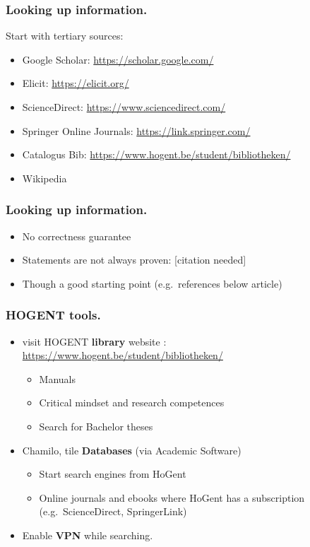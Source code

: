 \documentclass[aspectratio=169]{beamer}
\begin{document}
\begin{frame}
    \frametitle{Looking up information.}

    Start with \alert{tertiary} sources:

    \begin{itemize}
        \item Google Scholar: \url{https://scholar.google.com/}
        \item Elicit: \url{https://elicit.org/}
        \item ScienceDirect: \url{https://www.sciencedirect.com/}
        \item Springer Online Journals: \url{https://link.springer.com/}
        \item Catalogus Bib: \url{https://www.hogent.be/student/bibliotheken/}
        \item Wikipedia
    \end{itemize}
\end{frame}

\begin{frame}
    \frametitle{Looking up information.}


    {\pause}

    \begin{itemize}
        \item No correctness guarantee
        \item Statements are not always proven: [citation needed]
        \item \alert{Though} a good starting point (e.g.\ references below article)
    \end{itemize}
\end{frame}

\begin{frame}
    \frametitle{HOGENT tools.}

    \begin{itemize}
        \item<+-> visit HOGENT \textbf{library} website : \url{https://www.hogent.be/student/bibliotheken/}
            \begin{itemize}
                \item Manuals
                \item Critical mindset and research competences
                \item Search for Bachelor theses
            \end{itemize}
        \item<+-> Chamilo, tile \textbf{Databases} (via Academic Software)
            \begin{itemize}
                \item Start search engines from HoGent
                \item Online journals and ebooks where HoGent has a subscription (e.g.~ScienceDirect, SpringerLink)
            \end{itemize}
        \item<+-> Enable \textbf{VPN} while searching.
    \end{itemize}
\end{frame}
\end{document}
